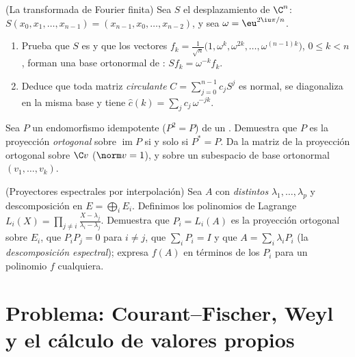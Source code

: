\begin{exercise}[$\star\star$]\label{exo:b2:hermitian:10}
(La transformada de Fourier finita) Sea $S$ el desplazamiento
 de $\C^n$: $S(x_0, x_1, \dots, x_{n-1}) = (x_{n-1}, x_0,
\dots, x_{n-2})$, y sea $\omega = \eu^{2\iu\pi/n}$.
\begin{enumerate}
  \item Prueba que $S$ es  y que los vectores $f_k =
        \frac{1}{\sqrt n}\bigl(1, \omega^k, \omega^{2k}, \dots,
        \omega^{(n-1)k}\bigr)$, $0 \leq k < n$, forman una base
        ortonormal de : $Sf_k = \omega^{-k} f_k$.
  \item Deduce que toda matriz \emph{circulante} $C =
        \sum_{j=0}^{n-1} c_jS^j$ es normal, se diagonaliza en la
        misma base y tiene  $\widehat c(k) = \sum_j
        c_j\,\omega^{-jk}$.
\end{enumerate}
\end{exercise}

\begin{exercise}[$\star\star$]\label{exo:b2:hermitian:11}
Sea $P$ un endomorfismo idempotente ($P^2 = P$) de un . Demuestra que $P$ es la proyección \emph{ortogonal} sobre
$\operatorname{im} P$ si y solo si $P^* = P$. Da la matriz de la
proyección ortogonal sobre $\C v$ ($\norm v = 1$), y sobre un
subespacio de base ortonormal $(v_1, \dots, v_k)$.
\end{exercise}

\begin{exercise}[$\star\star\star$]\label{exo:b2:hermitian:12}
(Proyectores espectrales por interpolación) Sea $A$  con
 \emph{distintos} $\lambda_1, \dots, \lambda_p$ y
descomposición en  $E = \bigoplus_i E_i$.
Definimos los polinomios de Lagrange $L_i(X) = \prod_{j\neq i}\frac{X
- \lambda_j}{\lambda_i - \lambda_j}$. Demuestra que $P_i = L_i(A)$ es
la proyección ortogonal sobre $E_i$, que $P_iP_j = 0$ para $i \neq
j$, que $\sum_i P_i = I$ y que $A = \sum_i \lambda_iP_i$ (la
\emph{descomposición espectral}); expresa $f(A)$ en términos de los
$P_i$ para un polinomio $f$ cualquiera.
\end{exercise}

\section{Problema: Courant--Fischer, Weyl y el cálculo de valores
propios}

